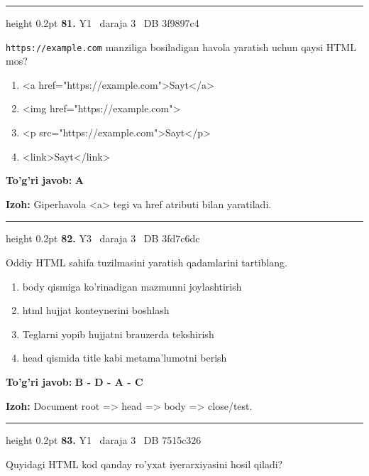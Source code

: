 \documentclass[10pt,a4paper,oneside]{article}
\begin{document}
\vspace{2mm}\hrule height 0.2pt \vspace{4mm}
\hypertarget{q81}{\textbf{\color{ink}81.}}  {\color{muted}\scriptsize Y1 \textbullet\ daraja 3 \textbullet\ DB 3f9897c4}
\par
\texttt{https://example.com} manziliga bosiladigan havola yaratish uchun qaysi HTML mos?
\begin{enumerate}[label=\Alph*),leftmargin=9mm]
\item \textless{}a href="https://example.com"\textgreater{}Sayt\textless{}/a\textgreater{}
\item \textless{}img href="https://example.com"\textgreater{}
\item \textless{}p src="https://example.com"\textgreater{}Sayt\textless{}/p\textgreater{}
\item \textless{}link\textgreater{}Sayt\textless{}/link\textgreater{}
\end{enumerate}
\begin{tcolorbox}[enhanced,breakable,colback=teal!4,colframe=teal!45!black,boxrule=0.45pt,arc=1.2mm,left=2.8mm,right=2.8mm,top=2mm,bottom=2mm,before skip=2mm,after skip=2mm]
\textbf{\color{teal}To'g'ri javob:} \textbf{A}
\par\smallskip
\textbf{Izoh:} Giperhavola \textless{}a\textgreater{} tegi va href atributi bilan yaratiladi.
\end{tcolorbox}
\vspace{2mm}\hrule height 0.2pt \vspace{4mm}
\hypertarget{q82}{\textbf{\color{ink}82.}}  {\color{muted}\scriptsize Y3 \textbullet\ daraja 3 \textbullet\ DB 3fd7c6dc}
\par
Oddiy HTML sahifa tuzilmasini yaratish qadamlarini tartiblang.
\begin{enumerate}[label=\Alph*),leftmargin=9mm]
\item body qismiga ko'rinadigan mazmunni joylashtirish
\item html hujjat konteynerini boshlash
\item Teglarni yopib hujjatni brauzerda tekshirish
\item head qismida title kabi metama'lumotni berish
\end{enumerate}
\begin{tcolorbox}[enhanced,breakable,colback=teal!4,colframe=teal!45!black,boxrule=0.45pt,arc=1.2mm,left=2.8mm,right=2.8mm,top=2mm,bottom=2mm,before skip=2mm,after skip=2mm]
\textbf{\color{teal}To'g'ri javob:} \textbf{B - D - A - C}
\par\smallskip
\textbf{Izoh:} Document root =\textgreater{} head =\textgreater{} body =\textgreater{} close/test.
\end{tcolorbox}
\vspace{2mm}\hrule height 0.2pt \vspace{4mm}
\hypertarget{q83}{\textbf{\color{ink}83.}}  {\color{muted}\scriptsize Y1 \textbullet\ daraja 3 \textbullet\ DB 7515c326}
\par
Quyidagi HTML kod qanday ro'yxat iyerarxiyasini hosil qiladi?
\end{document}
